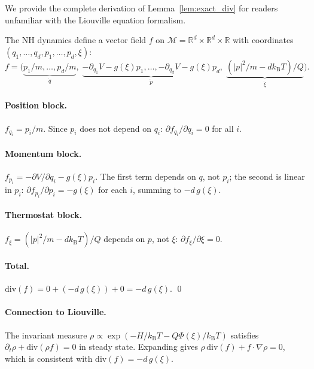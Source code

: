 \documentclass[11pt]{article}
\newcommand{\R}{\mathbb{R}}
\newcommand{\divergence}{\mathrm{div}}
\newcommand{\kT}{k_{\mathrm{B}}T}
\begin{document}
We provide the complete derivation of Lemma~\ref{lem:exact_div} for readers
unfamiliar with the Liouville equation formalism.

The NH dynamics define a vector field $f$ on $\mathcal{M} = \R^d \times \R^d
\times \R$ with coordinates $(q_1, \ldots, q_d, p_1, \ldots, p_d, \xi)$:
\begin{equation}
  f = \bigl(\underbrace{p_1/m, \ldots, p_d/m}_{\dot{q}},\;
    \underbrace{-\partial_{q_1}V - g(\xi)p_1, \ldots,
      -\partial_{q_d}V - g(\xi)p_d}_{\dot{p}},\;
    \underbrace{(|p|^2/m - d\kT)/Q}_{\dot{\xi}}\bigr).
\end{equation}

\paragraph{Position block.}
$f_{q_i} = p_i / m$. Since $p_i$ does not depend on $q_i$:
$\partial f_{q_i}/\partial q_i = 0$ for all $i$.

\paragraph{Momentum block.}
$f_{p_i} = -\partial V/\partial q_i - g(\xi) p_i$. The first term depends on
$q$, not $p_i$; the second is linear in $p_i$:
$\partial f_{p_i}/\partial p_i = -g(\xi)$ for each $i$, summing to $-d\,g(\xi)$.

\paragraph{Thermostat block.}
$f_\xi = (|p|^2/m - d\kT)/Q$ depends on $p$, not $\xi$:
$\partial f_\xi/\partial \xi = 0$.

\paragraph{Total.}
$\divergence(f) = 0 + (-d\,g(\xi)) + 0 = -d\,g(\xi)$. \qed

\paragraph{Connection to Liouville.}
The invariant measure $\rho \propto \exp(-H/\kT - Q\Phi(\xi)/\kT)$ satisfies
$\partial_t \rho + \divergence(\rho f) = 0$ in steady state. Expanding gives
$\rho\,\divergence(f) + f \cdot \nabla\rho = 0$, which is consistent with
$\divergence(f) = -d\,g(\xi)$.

\end{document}
